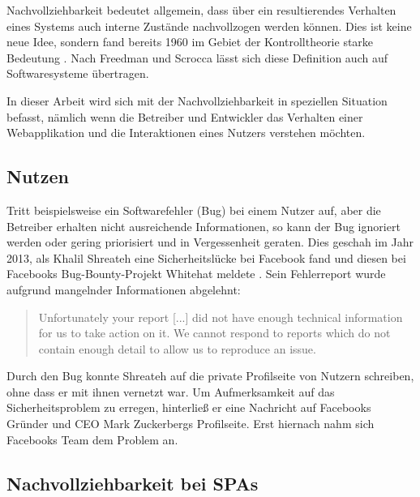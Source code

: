 Nachvollziehbarkeit bedeutet allgemein, dass über ein resultierendes Verhalten eines Systems auch interne Zustände nachvollzogen werden können. Dies ist keine neue Idee, sondern fand bereits 1960 im Gebiet der Kontrolltheorie starke Bedeutung \cite{OnTheGeneralTheoryOfControlSystems}. Nach Freedman \cite{TestabilityOfSoftwareComponents} und Scrocca \etal \cite{EnablingEventDrivenObservability} lässt sich diese Definition auch auf Softwaresysteme übertragen.
	
In dieser Arbeit wird sich mit der Nachvollziehbarkeit in speziellen Situation befasst, nämlich wenn die Betreiber und Entwickler das Verhalten einer Webapplikation und die Interaktionen eines Nutzers verstehen möchten.%
	
\subsection{Nutzen}
	
Tritt beispielsweise ein Softwarefehler (Bug) bei einem Nutzer auf, aber die Betreiber erhalten nicht ausreichende Informationen, so kann der Bug ignoriert werden oder gering priorisiert und in Vergessenheit geraten. Dies geschah im Jahr 2013, als Khalil Shreateh eine Sicherheitslücke bei Facebook fand und diesen bei Facebooks Bug-Bounty-Projekt Whitehat meldete \cite{FacebookBugBounyHunt}. Sein Fehlerreport wurde aufgrund mangelnder Informationen abgelehnt:
	
\begin{quotation}
Unfortunately your report [...] did not have enough technical information for us to take action  on  it. We  cannot  respond  to  reports  which  do  not contain enough detail to allow us to reproduce an issue.
\end{quotation}
	
Durch den Bug konnte Shreateh auf die private Profilseite von Nutzern schreiben, ohne dass er mit ihnen vernetzt war. Um Aufmerksamkeit auf das Sicherheitsproblem zu erregen, hinterließ er eine Nachricht auf Facebooks Gründer und CEO Mark Zuckerbergs Profilseite. Erst hiernach nahm sich Facebooks Team dem Problem an.
	
\subsection{Nachvollziehbarkeit bei SPAs}
	

